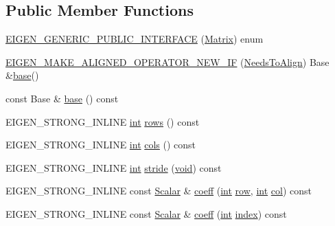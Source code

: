 \subsection*{Public Member Functions}
\begin{DoxyCompactItemize}
\item 
\hyperlink{class_matrix_a3897045958b46183474e4ff1ed447a8e}{E\-I\-G\-E\-N\-\_\-\-G\-E\-N\-E\-R\-I\-C\-\_\-\-P\-U\-B\-L\-I\-C\-\_\-\-I\-N\-T\-E\-R\-F\-A\-C\-E} (\hyperlink{class_matrix}{Matrix}) enum
\item 
\hyperlink{class_matrix_a8a7c2feb7223c4a9c4bee929ac38cb69}{E\-I\-G\-E\-N\-\_\-\-M\-A\-K\-E\-\_\-\-A\-L\-I\-G\-N\-E\-D\-\_\-\-O\-P\-E\-R\-A\-T\-O\-R\-\_\-\-N\-E\-W\-\_\-\-I\-F} (\hyperlink{class_matrix_a4449cc5b7cfb0068189194ee2acbdc18a47b4646119f7f6e843fd50555b8366a9}{Needs\-To\-Align}) Base \&\hyperlink{class_matrix_a141c34b308f4d61762ecacade8fbb406}{base}()
\item 
const Base \& \hyperlink{class_matrix_a141c34b308f4d61762ecacade8fbb406}{base} () const 
\item 
E\-I\-G\-E\-N\-\_\-\-S\-T\-R\-O\-N\-G\-\_\-\-I\-N\-L\-I\-N\-E \hyperlink{ioapi_8h_a787fa3cf048117ba7123753c1e74fcd6}{int} \hyperlink{class_matrix_a5c0643ac5b12c576300a3c60899a61c9}{rows} () const 
\item 
E\-I\-G\-E\-N\-\_\-\-S\-T\-R\-O\-N\-G\-\_\-\-I\-N\-L\-I\-N\-E \hyperlink{ioapi_8h_a787fa3cf048117ba7123753c1e74fcd6}{int} \hyperlink{class_matrix_a6457e87782c95b003d23f8b8b90e6838}{cols} () const 
\item 
E\-I\-G\-E\-N\-\_\-\-S\-T\-R\-O\-N\-G\-\_\-\-I\-N\-L\-I\-N\-E \hyperlink{ioapi_8h_a787fa3cf048117ba7123753c1e74fcd6}{int} \hyperlink{class_matrix_af537bf3bda58cb46e5d00bcf702a5bce}{stride} (\hyperlink{group___u_a_v_objects_plugin_ga444cf2ff3f0ecbe028adce838d373f5c}{void}) const 
\item 
E\-I\-G\-E\-N\-\_\-\-S\-T\-R\-O\-N\-G\-\_\-\-I\-N\-L\-I\-N\-E const \hyperlink{class_matrix_base_a625df8339dc2d816cbc0fd66e7dadaf5}{Scalar} \& \hyperlink{class_matrix_aff92ad7fe6eb3facf9cf1bb132b95897}{coeff} (\hyperlink{ioapi_8h_a787fa3cf048117ba7123753c1e74fcd6}{int} \hyperlink{glext_8h_a11b277b422822f784ee248b43eee3e1e}{row}, \hyperlink{ioapi_8h_a787fa3cf048117ba7123753c1e74fcd6}{int} \hyperlink{class_matrix_base_ae3c94b0f25b4273c7a8125169bdf60e0}{col}) const 
\item 
E\-I\-G\-E\-N\-\_\-\-S\-T\-R\-O\-N\-G\-\_\-\-I\-N\-L\-I\-N\-E const \hyperlink{class_matrix_base_a625df8339dc2d816cbc0fd66e7dadaf5}{Scalar} \& \hyperlink{class_matrix_ad3068bb42858ce1c1fe56c54e893069a}{coeff} (\hyperlink{ioapi_8h_a787fa3cf048117ba7123753c1e74fcd6}{int} \hyperlink{glext_8h_ab47dd9958bcadea08866b42bf358e95e}{index}) const 

\end{DoxyCompactItemize}
